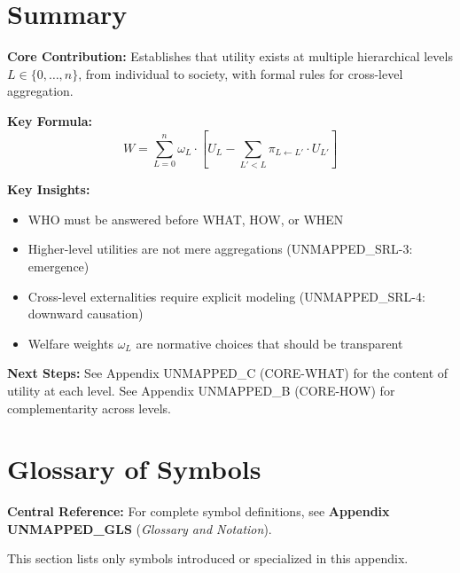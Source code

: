 \section{Summary}
\label{sec:who-summary}

\begin{tcolorbox}[colback=gray!5!white, colframe=gray!75!black,
    title=Appendix UNMAPPED_AAA Summary: CORE-WHO]

\textbf{Core Contribution:}
Establishes that utility exists at multiple hierarchical levels $L \in \{0, \ldots, n\}$,
from individual to society, with formal rules for cross-level aggregation.

\textbf{Key Formula:}
\begin{equation}
W = \sum_{L=0}^{n} \omega_L \cdot \left[ U_L - \sum_{L' < L} \pi_{L \leftarrow L'} \cdot U_{L'} \right]
\end{equation}

\textbf{Key Insights:}
\begin{itemize}[nosep]
\item WHO must be answered before WHAT, HOW, or WHEN
\item Higher-level utilities are not mere aggregations (UNMAPPED_SRL-3: emergence)
\item Cross-level externalities require explicit modeling (UNMAPPED_SRL-4: downward causation)
\item Welfare weights $\omega_L$ are normative choices that should be transparent
\end{itemize}

\textbf{Next Steps:}
See Appendix UNMAPPED_C (CORE-WHAT) for the content of utility at each level.
See Appendix UNMAPPED_B (CORE-HOW) for complementarity across levels.

\end{tcolorbox}


\section{Glossary of Symbols}
\label{sec:who-glossary}

\begin{tcolorbox}[colback=blue!5!white, colframe=blue!75!black]
\textbf{Central Reference:} For complete symbol definitions, see
\textbf{Appendix UNMAPPED_GLS} (\textit{Glossary and Notation}).

This section lists only symbols introduced or specialized in this appendix.
\end{tcolorbox}

